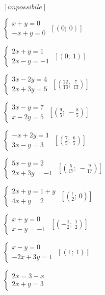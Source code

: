 \begin{esercizio}[\Ast]
\begin{multicols}{2}
\begin{enumeratea}
 \hfill \(\left[impossibile\right]\)
 \item \(\left\{\begin{array}{l}x+y=0\\-x+y=0\end{array}\right.\)
 \hfill \(\left[(0;~0)\right]\)
 \item \(\left\{\begin{array}{l}2x+y=1 \\2x-y=-1\end{array}\right.\)
 \hfill \(\left[(0;~1)\right]\)
\item \(\left\{\begin{array}{l}3x-2y=4 \\2x+3y=5\end{array}\right.\)
 \hfill \(\left[\left(\frac{22}{13};~\frac{7}{13}\right)\right]\)
\item \(\left\{\begin{array}{l}3x-y=7 \\x-2y=5 \end{array}\right.\)
 \hfill \(\left[\left(\frac{9}{5};~-\frac{8}{5}\right)\right]\)
\item \(\left\{\begin{array}{l}-x+2y=1 \\3x-y=3\end{array}\right.\)
 \hfill \(\left[\left(\frac{7}{5};~\frac{6}{5}\right)\right]\)
\item \(\left\{\begin{array}{l}5x-y=2\\2x+3y=-1 \end{array}\right.\)
 \hfill \(\left[\left(\frac{5}{17};~-\frac{9}{17}\right)\right]\)
 \item \(\left\{\begin{array}{l}2x+y=1+y\\4x+y=2\end{array}\right.\)
 \hfill \(\left[\left(\frac{1}{2};~0\right)\right]\)
 \item \(\left\{\begin{array}{l}x+y=0\\x-y=-1\end{array}\right.\)
 \hfill \(\left[\left(-{\frac{1}{2}};~\frac{1}{2}\right)\right]\)
 \item \(\left\{\begin{array}{l}x-y=0\\-2x+3y=1\end{array}\right.\)
 \hfill \(\left[(1;~1)\right]\)
 \item \(\left\{\begin{array}{l}2x=3-x\\2x+y=3\end{array}\right.\)

\end{enumeratea}
\end{multicols}
\end{esercizio}
